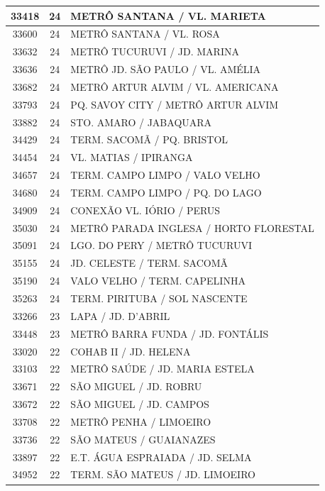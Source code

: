\documentclass[
	12pt,				%
	oneside,			%
	a4paper,			%
	english,			%
	brazil				%
	]{abntex2ppgsi}
\begin{document}
\begin{apendicesenv}
\begin{longtable}{c|c|p{7cm}}
\hline
    33418 & 24    & METRÔ SANTANA / VL. MARIETA \\
\hline
    33600 & 24    & METRÔ SANTANA / VL. ROSA \\
\hline
    33632 & 24    & METRÔ TUCURUVI / JD. MARINA \\
\hline
    33636 & 24    & METRÔ JD. SÃO PAULO / VL. AMÉLIA \\
\hline
    33682 & 24    & METRÔ ARTUR ALVIM / VL. AMERICANA \\
\hline
    33793 & 24    & PQ. SAVOY CITY / METRÔ ARTUR ALVIM \\
\hline
    33882 & 24    & STO. AMARO / JABAQUARA \\
\hline
    34429 & 24    & TERM. SACOMÃ / PQ. BRISTOL \\
\hline
    34454 & 24    & VL. MATIAS / IPIRANGA \\
\hline
    34657 & 24    & TERM. CAMPO LIMPO / VALO VELHO \\
\hline
    34680 & 24    & TERM. CAMPO LIMPO / PQ. DO LAGO \\
\hline
    34909 & 24    & CONEXÃO VL. IÓRIO / PERUS \\
\hline
    35030 & 24    & METRÔ PARADA INGLESA / HORTO FLORESTAL \\
\hline
    35091 & 24    & LGO. DO PERY / METRÔ TUCURUVI \\
\hline
    35155 & 24    & JD. CELESTE / TERM. SACOMÃ \\
\hline
    35190 & 24    & VALO VELHO / TERM. CAPELINHA \\
\hline
    35263 & 24    & TERM. PIRITUBA / SOL NASCENTE \\
\hline
    33266 & 23    & LAPA / JD. D'ABRIL \\
\hline
    33448 & 23    & METRÔ BARRA FUNDA / JD. FONTÁLIS \\
\hline
    33020 & 22    & COHAB II / JD. HELENA \\
\hline
    33103 & 22    & METRÔ SAÚDE / JD. MARIA ESTELA \\
\hline
    33671 & 22    & SÃO MIGUEL / JD. ROBRU \\
\hline
    33672 & 22    & SÃO MIGUEL / JD. CAMPOS \\
\hline
    33708 & 22    & METRÔ PENHA / LIMOEIRO \\
\hline
    33736 & 22    & SÃO MATEUS / GUAIANAZES \\
\hline
    33897 & 22    & E.T. ÁGUA ESPRAIADA / JD. SELMA \\
\hline
    34952 & 22    & TERM. SÃO MATEUS / JD. LIMOEIRO \\

\end{longtable}
\end{apendicesenv}
\end{document}

